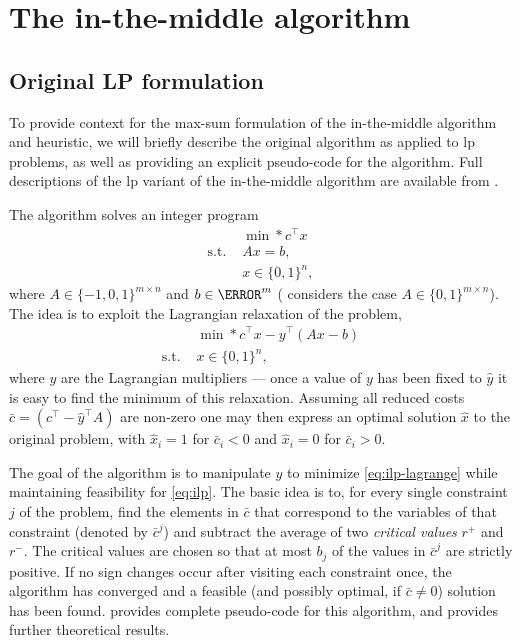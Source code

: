 \section{The in-the-middle algorithm}

\subsection{Original LP formulation}
To provide context for the max-sum formulation of the in-the-middle algorithm and heuristic, we will briefly describe the original algorithm as applied to \gls{lp} problems, as well as providing an explicit pseudo-code for the algorithm.
Full descriptions of the \gls{lp} variant of the in-the-middle algorithm are available from \textcites{Wedelin95}{Bastert10}.

The algorithm solves an integer program
\begin{equation}\label{eq:ilp}
	\begin{aligned}
		{}           & \min*{c^\top x} \\
		\text{s.t. } & Ax = b, \\
		{}           & x \in \{0,1\}^n,
	\end{aligned}
\end{equation}
where \(A \in \{-1,0,1\}^{m\times n}\) and \(b\in\N^m\) (\textcite{Wedelin95} considers the case \(A \in \{0,1\}^{m\times n}\)).
The idea is to exploit the Lagrangian relaxation of the problem,
\begin{equation}\label{eq:ilp-lagrange}
	\begin{aligned}
		{}           & \min*{c^\top x - y^\top (Ax - b)}\\
		\text{s.t. } & x \in \{0,1\}^n,
	\end{aligned}
\end{equation}
where \(y\) are the Lagrangian multipliers --- once a value of \(y\) has been fixed to \(\hat{y}\) it is easy to find the minimum of this relaxation.
Assuming all reduced costs \(\bar{c} = (c^\top - \hat{y}^\top A)\) are non-zero one may then express an optimal solution \(\hat{x}\) to the original problem, with \(\hat{x}_i = 1\) for \(\bar{c}_i < 0\) and \(\hat{x}_i = 0\) for \(\bar{c}_i > 0\).

The goal of the algorithm is to manipulate \(y\) to minimize \eqref{eq:ilp-lagrange} while maintaining feasibility for \eqref{eq:ilp}.
The basic idea is to, for every single constraint \(j\) of the problem, find the elements in \(\bar{c}\) that correspond to the variables of that constraint (denoted by \(\bar{c}^j\)) and subtract the average of two \emph{critical values} \(r^+\) and \(r^-\).
The critical values are chosen so that at most \(b_j\) of the values in \(\bar{c}^j\) are strictly positive.
If no sign changes occur after visiting each constraint once, the algorithm has converged and a feasible (and possibly optimal, if \(\bar{c} \neq 0\)) solution has been found.
 provides complete pseudo-code for this algorithm, and \textcites{Wedelin95}{Wedelin13} provides further theoretical results.

